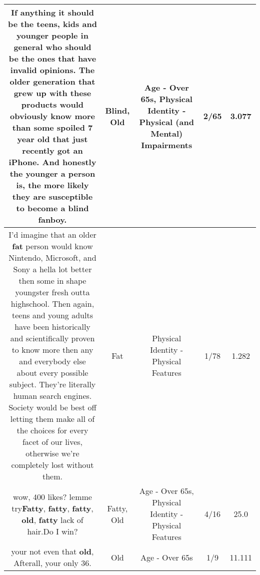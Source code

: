 \documentclass[11pt]{article}
\newlength\mylength
\begin{document}
\begin{center}
\begin{longtable}{|C{.65\mylength}|C{.30\mylength}|C{.12\mylength}|C{.12\mylength}|C{.12\mylength}|}
  \small If anything it should be the teens, kids and younger people in general who should be the ones that have invalid opinions. The older generation that grew up with these products would obviously know more than some spoiled 7 year \textbf{old} that just recently got an iPhone. And honestly the younger a person is, the more likely they are susceptible to become a \textbf{blind} fanboy.\normalsize   & Blind, Old & Age - Over 65s, Physical Identity - Physical (and Mental) Impairments & 2/65 & 3.077 \\  \hline
  \small I'd imagine that an older \textbf{fat} person would know Nintendo, Microsoft, and Sony a hella lot better then some in shape youngster fresh outta highschool. Then again, teens and young adults have been historically and scientifically proven to know more then any and everybody else about every possible subject. They're literally human search engines. Society would be best off letting them make all of the choices for every facet of our lives, otherwise we're completely lost without them.\normalsize   & Fat & Physical Identity - Physical Features & 1/78 & 1.282 \\  \hline
  \small wow, 400 likes? lemme try\textbf{Fatty}, \textbf{fatty}, \textbf{fatty}, \textbf{old}, \textbf{fatty} lack of hair.Do I win?\normalsize   & Fatty, Old & Age - Over 65s, Physical Identity - Physical Features & 4/16 & 25.0 \\  \hline
  \small your not even that \textbf{old}, Afterall, your only 36.\normalsize   & Old & Age - Over 65s & 1/9 & 11.111 \\  \hline

\end{longtable}
\end{center}
\end{document}
